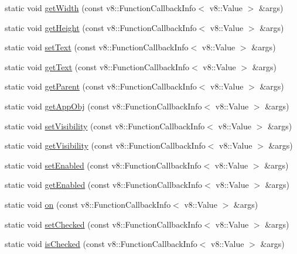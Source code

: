 \begin{DoxyCompactItemize}
static void \mbox{\hyperlink{class_rad_j_a_v_1_1_g_u_i_1_1_radio_a9fdf694741aa8a2ec7f433c3fe159910}{get\+Width}} (const v8\+::\+Function\+Callback\+Info$<$ v8\+::\+Value $>$ \&args)
\item 
static void \mbox{\hyperlink{class_rad_j_a_v_1_1_g_u_i_1_1_radio_a3ec9fcce9d2b25cd1349429fc3d78778}{get\+Height}} (const v8\+::\+Function\+Callback\+Info$<$ v8\+::\+Value $>$ \&args)
\item 
static void \mbox{\hyperlink{class_rad_j_a_v_1_1_g_u_i_1_1_radio_a6ed5d1d052ba3e31be9e3abb98c467c5}{set\+Text}} (const v8\+::\+Function\+Callback\+Info$<$ v8\+::\+Value $>$ \&args)
\item 
static void \mbox{\hyperlink{class_rad_j_a_v_1_1_g_u_i_1_1_radio_a318e198a0192aa4b8864a59e474995b5}{get\+Text}} (const v8\+::\+Function\+Callback\+Info$<$ v8\+::\+Value $>$ \&args)
\item 
static void \mbox{\hyperlink{class_rad_j_a_v_1_1_g_u_i_1_1_radio_a64007f29dc5164ff4bfd8cf42fdf77c6}{get\+Parent}} (const v8\+::\+Function\+Callback\+Info$<$ v8\+::\+Value $>$ \&args)
\item 
static void \mbox{\hyperlink{class_rad_j_a_v_1_1_g_u_i_1_1_radio_ae54a287e73d21368c9c7fa9a6775cd21}{get\+App\+Obj}} (const v8\+::\+Function\+Callback\+Info$<$ v8\+::\+Value $>$ \&args)
\item 
static void \mbox{\hyperlink{class_rad_j_a_v_1_1_g_u_i_1_1_radio_ae243c13c7d20135d84d19b2d311e871c}{set\+Visibility}} (const v8\+::\+Function\+Callback\+Info$<$ v8\+::\+Value $>$ \&args)
\item 
static void \mbox{\hyperlink{class_rad_j_a_v_1_1_g_u_i_1_1_radio_a19cdb4351516ceed4cb151c6e54ad584}{get\+Visibility}} (const v8\+::\+Function\+Callback\+Info$<$ v8\+::\+Value $>$ \&args)
\item 
static void \mbox{\hyperlink{class_rad_j_a_v_1_1_g_u_i_1_1_radio_ad7764fce618c635b584d1fda36e3daa3}{set\+Enabled}} (const v8\+::\+Function\+Callback\+Info$<$ v8\+::\+Value $>$ \&args)
\item 
static void \mbox{\hyperlink{class_rad_j_a_v_1_1_g_u_i_1_1_radio_a6dd9ce2bf30ab761488f3c3a745ae208}{get\+Enabled}} (const v8\+::\+Function\+Callback\+Info$<$ v8\+::\+Value $>$ \&args)
\item 
static void \mbox{\hyperlink{class_rad_j_a_v_1_1_g_u_i_1_1_radio_a3d0ba268b729f4f35f4255b49550bc6f}{on}} (const v8\+::\+Function\+Callback\+Info$<$ v8\+::\+Value $>$ \&args)
\item 
static void \mbox{\hyperlink{class_rad_j_a_v_1_1_g_u_i_1_1_radio_ae4d7b8f51cacec44e1371481104b7bf9}{set\+Checked}} (const v8\+::\+Function\+Callback\+Info$<$ v8\+::\+Value $>$ \&args)
\item 
static void \mbox{\hyperlink{class_rad_j_a_v_1_1_g_u_i_1_1_radio_ab2b11cceb35e6fe78a11682fe669573d}{is\+Checked}} (const v8\+::\+Function\+Callback\+Info$<$ v8\+::\+Value $>$ \&args)
\end{DoxyCompactItemize}


